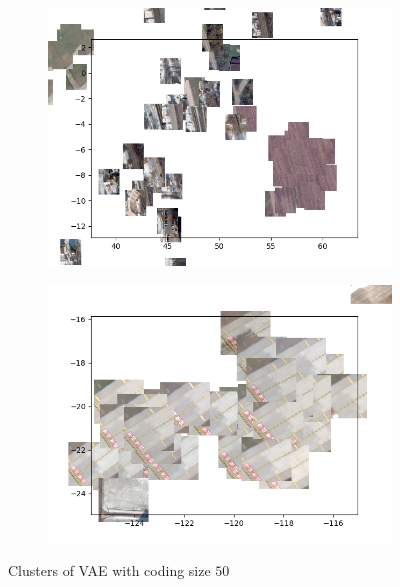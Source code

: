 \begin{figure}[H]
\begin{subfigure}{.5\textwidth}
        \includegraphics[width=\textwidth]
        {images/figures/experiments_latent/convolutional_dim50_images_upwards_observation.png}  
    \end{subfigure}%
    \begin{subfigure}{.5\textwidth}
        \centering
        \includegraphics[width=\textwidth]
        {images/figures/experiments_latent/convolutional_dim50_images_sideways_other_street.png}
    \end{subfigure}
    \caption{Clusters of VAE with coding size $50$}
    \label{figure_closer_clusters}
\end{figure} 





